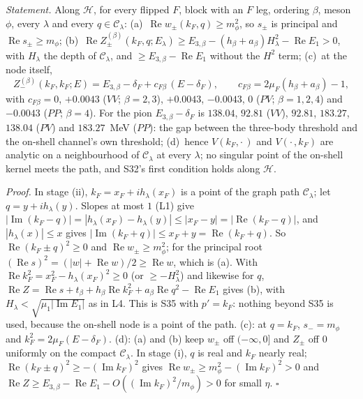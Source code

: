 \documentclass[11pt]{article}
\begin{document}
\emph{Statement.} Along $\mathcal H$, for every flipped $F$, block with an $F$ leg, ordering $\beta$, meson $\phi$, every $\lambda$ and every $q\in\mathcal C_\lambda$:
(a)~$\operatorname{Re}w_\pm(k_F,q)\ge m_\phi^2$, so $s_\pm$ is principal and $\operatorname{Re}s_\pm\ge m_\phi$;
(b)~$\operatorname{Re}Z^{(\beta)}_\pm(k_F,q;E_\lambda)\ge E_{3,\beta}-(h_\beta+a_\beta)H_\lambda^2-\operatorname{Re}E_1>0$, with $H_\lambda$ the depth of $\mathcal C_\lambda$, and $\ge E_{3,\beta}-\operatorname{Re}E_1$ without the $H^2$ term;
(c)~at the node itself,
\begin{equation}\label{eq:diag}
Z^{(\beta)}_-(k_F,k_F;E)=E_{3,\beta}-\delta_F+c_{F\beta}\,(E-\delta_F),\qquad c_{F\beta}=2\mu_F(h_\beta+a_\beta)-1,
\end{equation}
with $c_{F\beta}=0$, $+0.0043$ ($VV$; $\beta=2,3$), $+0.0043$, $-0.0043$, $0$ ($PV$; $\beta=1,2,4$) and $-0.0043$ ($PP$; $\beta=4$). For the pion $E_{3,\beta}-\delta_F$ is $138.04$, $92.81$ ($VV$), $92.81$, $183.27$, $138.04$ ($PV$) and $183.27$~MeV ($PP$): the gap between the three-body threshold and the on-shell channel's own threshold;
(d)~hence $V(k_F,\cdot\,)$ and $V(\cdot\,,k_F)$ are analytic on a neighbourhood of $\mathcal C_\lambda$ at every $\lambda$; no singular point of the on-shell kernel meets the path, and S32's first condition holds along $\mathcal H$.

\emph{Proof.} In stage (ii), $k_F=x_F+ih_\lambda(x_F)$ is a point of the graph path $\mathcal C_\lambda$; let $q=y+ih_\lambda(y)$. Slopes at most $1$ (L1) give $|\operatorname{Im}(k_F-q)|=|h_\lambda(x_F)-h_\lambda(y)|\le|x_F-y|=|\operatorname{Re}(k_F-q)|$, and $|h_\lambda(x)|\le x$ gives $|\operatorname{Im}(k_F+q)|\le x_F+y=\operatorname{Re}(k_F+q)$. So $\operatorname{Re}(k_F\pm q)^2\ge0$ and $\operatorname{Re}w_\pm\ge m_\phi^2$; for the principal root $(\operatorname{Re}s)^2=(|w|+\operatorname{Re}w)/2\ge\operatorname{Re}w$, which is (a). With $\operatorname{Re}k_F^2=x_F^2-h_\lambda(x_F)^2\ge0$ (or $\ge-H_\lambda^2$) and likewise for $q$, $\operatorname{Re}Z=\operatorname{Re}s+t_\beta+h_\beta\operatorname{Re}k_F^2+a_\beta\operatorname{Re}q^2-\operatorname{Re}E_1$ gives (b), with $H_\lambda<\sqrt{\mu_1|\operatorname{Im}E_1|}$ as in L4. This is S35 with $p'=k_F$: nothing beyond S35 is used, because the on-shell node is a point of the path. (c): at $q=k_F$, $s_-=m_\phi$ and $k_F^2=2\mu_F(E-\delta_F)$. (d): (a) and (b) keep $w_\pm$ off $(-\infty,0]$ and $Z_\pm$ off $0$ uniformly on the compact $\mathcal C_\lambda$. In stage (i), $q$ is real and $k_F$ nearly real; $\operatorname{Re}(k_F\pm q)^2\ge-(\operatorname{Im}k_F)^2$ gives $\operatorname{Re}w_\pm\ge m_\phi^2-(\operatorname{Im}k_F)^2>0$ and $\operatorname{Re}Z\ge E_{3,\beta}-\operatorname{Re}E_1-O((\operatorname{Im}k_F)^2/m_\phi)>0$ for small $\eta$. $\square$
\end{document}
